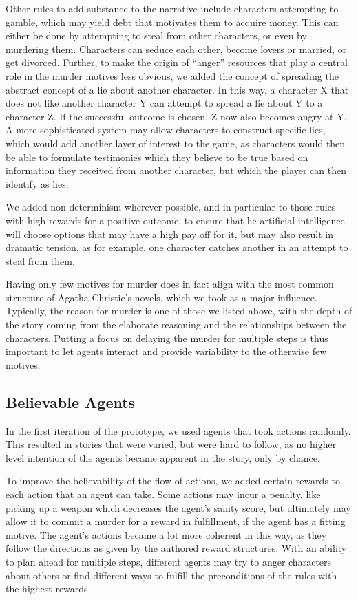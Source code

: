 Other rules to add substance to the narrative include characters attempting to gamble, which may yield debt that motivates them to acquire money.
This can either be done by attempting to steal from other characters, or even by murdering them.
Characters can seduce each other, become lovers or married, or get divorced.
Further, to make the origin of \enquote{anger} resources that play a central role in the murder motives less obvious, we added the concept of spreading the abstract concept of a lie about another character.
In this way, a character X that does not like another character Y can attempt to spread a lie about Y to a character Z.
If the successful outcome is chosen, Z now also becomes angry at Y.
A more sophisticated system may allow characters to construct specific lies, which would add another layer of interest to the game, as characters would then be able to formulate testimonies which they believe to be true based on information they received from another character, but which the player can then identify as lies.

We added non determinism wherever possible, and in particular to those rules with high rewards for a positive outcome, to ensure that he artificial intelligence will choose options that may have a high pay off for it, but may also result in dramatic tension, as for example, one character catches another in an attempt to steal from them.

Having only few motives for murder does in fact align with the most common structure of Agatha Christie's novels, which we took as a major influence.
Typically, the reason for murder is one of those we listed above, with the depth of the story coming from the elaborate reasoning and the relationships between the characters.
Putting a focus on delaying the murder for multiple steps is thus important to let agents interact and provide variability to the otherwise few motives.

\subsection{Believable Agents}
In the first iteration of the prototype, we used agents that took actions randomly. This resulted in stories that were varied, but were hard to follow, as no higher level intention of the agents became apparent in the story, only by chance.

To improve the believability of the flow of actions, we added certain rewards to each action that an agent can take. Some actions may incur a penalty, like picking up a weapon which decreases the agent's sanity score, but ultimately may allow it to commit a murder for a reward in fulfillment, if the agent has a fitting motive. The agent's actions became a lot more coherent in this way, as they follow the directions as given by the authored reward structures. With an ability to plan ahead for multiple steps, different agents may try to anger characters about others or find different ways to fulfill the preconditions of the rules with the highest rewards. 

